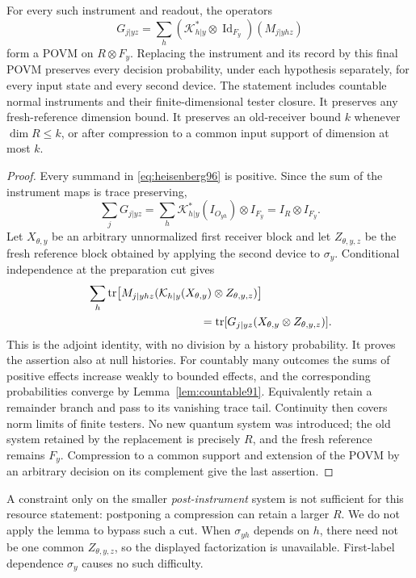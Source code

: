 \begin{lemma}\label{lem:postponement96}
For every such instrument and readout, the operators
\begin{equation}\label{eq:heisenberg96}
 G_{j|yz}=\sum_h
       (\mathcal K_{h|y}^{*}\otimes\operatorname{Id}_{F_y})(M_{j|yhz})
\end{equation}
form a POVM on $R\otimes F_y$.  Replacing the instrument and its record
by this final POVM preserves every decision probability, under each
hypothesis separately, for every input state and every second device.
The statement includes countable normal instruments and their
finite-dimensional tester closure.  It preserves any fresh-reference
dimension bound.  It preserves an old-receiver bound $k$ whenever
$\dim R\le k$, or after compression to a common input support of
dimension at most $k$.
\end{lemma}
\begin{proof}
Every summand in \eqref{eq:heisenberg96} is positive.  Since the sum of
the instrument maps is trace preserving,
\[
 \sum_jG_{j|yz}=\sum_h\mathcal K_{h|y}^{*}(I_{O_{yh}})
                                      \otimes I_{F_y}=I_R\otimes I_{F_y}.
\]
Let $X_{\theta,y}$ be an arbitrary unnormalized first receiver block
and let $Z_{\theta,y,z}$ be the fresh reference block obtained by
applying the second device to $\sigma_y$.  Conditional independence
at the preparation cut gives
\[
 \begin{split}
 &\sum_h\tr\bigl[M_{j|yhz}
        (\mathcal K_{h|y}(X_{\theta,y})\otimes Z_{\theta,y,z})\bigr]\\
 &\hspace{35mm}=\tr[G_{j|yz}(X_{\theta,y}\otimes Z_{\theta,y,z})].
 \end{split}
\]
This is the adjoint identity, with no division by a history
probability.  It proves the assertion also at null histories.
For countably many outcomes the sums of positive effects increase
weakly to bounded effects, and the corresponding probabilities
converge by Lemma~\ref{lem:countable91}.  Equivalently retain a remainder
branch and pass to its vanishing trace tail.  Continuity then covers
norm limits of finite testers.  No new quantum system was introduced;
the old system retained by the replacement is precisely $R$, and the
fresh reference remains $F_y$.  Compression to a common support and
extension of the POVM by an arbitrary decision on its complement give
the last assertion.
\end{proof}
A constraint only on the smaller \emph{post-instrument} system is not
sufficient for this resource statement: postponing a compression can
retain a larger $R$.  We do not apply the lemma to bypass such a cut.
When $\sigma_{yh}$ depends on $h$, there need not be one common
$Z_{\theta,y,z}$, so the displayed factorization is unavailable.
First-label dependence $\sigma_y$ causes no such difficulty.

